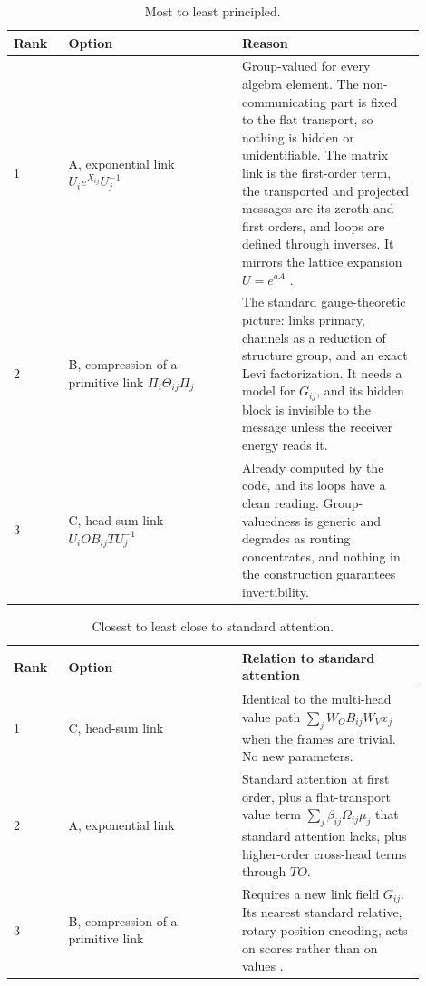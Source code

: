 \documentclass[11pt]{article}
\theoremstyle{definition}
\theoremstyle{remark}
\begin{document}
\begin{table}[h]
\centering
\small
\begin{tabular}{>{\raggedright}p{0.12\linewidth}>{\raggedright}p{0.38\linewidth}>{\raggedright\arraybackslash}p{0.40\linewidth}}
\toprule
Rank & Option & Reason \\
\midrule
1 & A, exponential link $U_ie^{X_{ij}}U_j^{-1}$ & Group-valued for every algebra element. The non-communicating part is fixed to the flat transport, so nothing is hidden or unidentifiable. The matrix link is the first-order term, the transported and projected messages are its zeroth and first orders, and loops are defined through inverses. It mirrors the lattice expansion $U=e^{aA}$ \cite{wilson1974,kogut1979}. \\
2 & B, compression of a primitive link $\Pi_i\Theta_{ij}\Pi_j$ & The standard gauge-theoretic picture: links primary, channels as a reduction of structure group, and an exact Levi factorization. It needs a model for $G_{ij}$, and its hidden block is invisible to the message unless the receiver energy reads it. \\
3 & C, head-sum link $U_iOB_{ij}TU_j^{-1}$ & Already computed by the code, and its loops have a clean reading. Group-valuedness is generic and degrades as routing concentrates, and nothing in the construction guarantees invertibility. \\
\bottomrule
\end{tabular}
\caption{Most to least principled.}
\label{tab:principled}
\end{table}

\begin{table}[h]
\centering
\small
\begin{tabular}{>{\raggedright}p{0.12\linewidth}>{\raggedright}p{0.38\linewidth}>{\raggedright\arraybackslash}p{0.40\linewidth}}
\toprule
Rank & Option & Relation to standard attention \\
\midrule
1 & C, head-sum link & Identical to the multi-head value path $\sum_jW_OB_{ij}W_Vx_j$ when the frames are trivial. No new parameters. \\
2 & A, exponential link & Standard attention at first order, plus a flat-transport value term $\sum_j\beta_{ij}\Omega_{ij}\mu_j$ that standard attention lacks, plus higher-order cross-head terms through $TO$. \\
3 & B, compression of a primitive link & Requires a new link field $G_{ij}$. Its nearest standard relative, rotary position encoding, acts on scores rather than on values \cite{su2021roformer}. \\
\bottomrule
\end{tabular}
\caption{Closest to least close to standard attention.}
\label{tab:standard}
\end{table}
\end{document}
